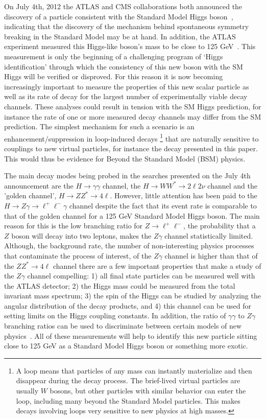On July 4th, 2012 the ATLAS and CMS collaborations both announced the 
discovery of a particle consistent with the 
Standard Model Higgs boson~\cite{ATLAS_Higgs,CMS_Higgs}, indicating that
the discovery of the mechanism behind spontaneous symmetry breaking in the
Standard Model may be at hand. In addition, the ATLAS experiment measured 
this Higgs-like boson's mass to be close to 125 GeV~\cite{ATLAS_Higgs_Dec12}.
This measurement is only the beginning of a challenging program of `Higgs
identification' through which the consistency of this new boson with the SM
Higgs will be verified or disproved. For this reason it is now becoming
increasingly important to measure the properties of this new scalar particle
as well as its rate of decay for the largest number of experimentally
viable decay channels. These analyses could result in tension with the SM
Higgs prediction, for instance the rate of one or more measured decay channels
may differ from the SM prediction. The simplest mechanism for such a scenario
is an enhancement/suppression in loop-induced decays
\footnote{A loop means that particles of any mass can instantly materialize and 
then disappear during the decay process. The brief-lived virtual particles
are usually $W$ bosons, but other particles with similar behavior can enter
the loop, including many beyond the Standard Model particles. This makes decays 
involving loops very sensitive to new physics at high masses.}
that are naturally sensitive to couplings to new virtual particles, 
for instance the decay \HToZg presented in this paper. 
This would thus be evidence for Beyond the Standard Model (BSM) physics.

The main decay modes being probed in the searches
presented on the July 4th announcement are the $H \to \gamma\gamma$ channel,
the $H \to WW^* \to 2\ell2\nu$ channel and the 'golden channel',
$H \to ZZ^* \to 4\ell$. However, little attention has been paid to the 
$H \to Z\gamma \to \ell^+\ell^-\gamma$ channel
despite the fact that its event rate is comparable to that of the golden channel 
for a 125 GeV Standard Model Higgs boson. The main reason for this is 
the low branching ratio for $Z \to \ell^+\ell^-$, the
probability that a $Z$ boson will decay into two leptons, 
makes the $Z\gamma$ channel statistically limited. 
Although, the background rate, the number of non-interesting physics processes
that contaminate the process of interest, of the $Z\gamma$ channel is higher than
that of the $ZZ^* \rightarrow 4\ell$ channel
there are a few important properties that make a study of the $Z\gamma$ channel 
compelling: 
1) all final state particles can be measured well with the ATLAS detector;  
2) the Higgs mass could be measured from the total invariant mass spectrum; 
3) the spin of the Higgs can be studied by analyzing the angular distribution 
of the decay products, and 
4) this channel can be used for setting limits on the Higgs coupling constants.
In addition, the ratio of $\gamma\gamma$ to $Z\gamma$ branching ratios can
be used to discriminate between certain models of 
new physics~\cite{Zg_newPhy_1,Zg_newPhy_2, Zg_newPhy_3}.
All of these measurements will help to identify this new particle sitting
close to 125 GeV as a Standard Model Higgs boson or something more exotic.

